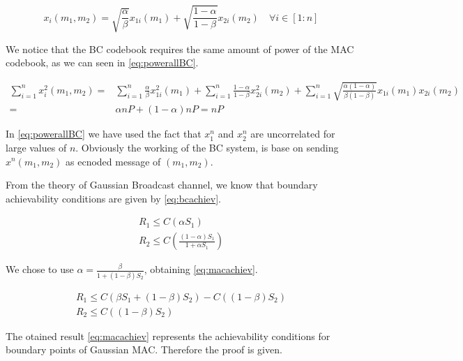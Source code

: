 \begin{equation}
	x_i(m_1,m_2)= \sqrt{\frac{\alpha}{\beta}}x_{1i}(m_1)+\sqrt{\frac{1-\alpha}{1-\beta}}x_{2i}(m_2) \quad \forall i \in [1:n]
	\label{eq:codebook}
\end{equation}

We notice that the BC codebook requires the same amount of power of the MAC codebook, as we can seen in \eqref{eq:powerallBC}.

\begin{equation}
	\begin{aligned}
		\sum_{i=1}^n x_i^2(m_1,m_2) = & \sum_{i=1}^n \frac{\alpha}{\beta} x_{1i}^2(m_1) + \sum_{i=1}^n \frac{1-\alpha}{1-\beta} x_{2i}^2(m_2) + \sum_{i=1}^n \sqrt{\frac{\alpha(1-\alpha)}{\beta(1-\beta)}} x_{1i}(m_1) x_{2i}(m_2)\\
		= & \alpha nP + (1-\alpha) nP = nP
	\end{aligned}
	\label{eq:powerallBC}
\end{equation}

In \eqref{eq:powerallBC} we have used the fact that $x_1^n$ and $x_2^n$ are uncorrelated for large values of $n$. Obviously the working of the BC system, is base on sending $x^n(m_1,m_2)$  as ecnoded message of $(m_1,m_2)$.

From the theory of Gaussian Broadcast channel, we know that boundary achievability conditions are given by \eqref{eq:bcachiev}.

\begin{equation}
\begin{gathered}
	R_1 \leq C(\alpha S_1) \\
	R_2  \leq C \left( \frac{(1-\alpha )S_1} {1+\alpha S_1} \right)
\end{gathered}
\label{eq:bcachiev}
\end{equation}

We chose to use $\alpha = \frac{\beta}{1+ (1-\beta) S_2}$, obtaining \eqref{eq:macachiev}.

\begin{equation}
\begin{gathered}
	R_1 \leq C (\beta S_1 + (1-\beta)S_2) - C((1-\beta)S_2) \\
	R_2  \leq   C \left( (1-\beta)S_2 \right)
\end{gathered}
\label{eq:macachiev}
\end{equation}

The otained result \eqref{eq:macachiev} represents the achievability conditions for boundary points of Gaussian MAC. Therefore the proof is given.
